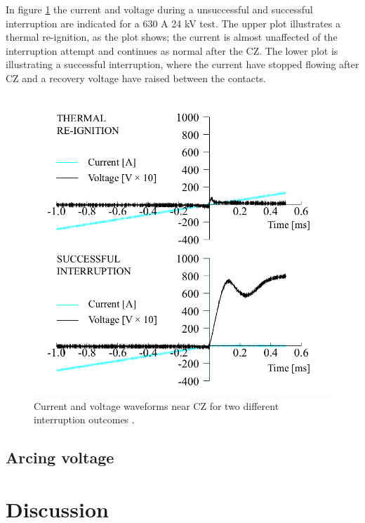 \documentclass[10pt,a4paper]{article} %
\begin{document}
In figure \ref{fig:CurrentAndVoltageWaveform} the current and voltage during a unsuccessful and successful interruption are indicated for a 630 A 24 kV test. The upper plot illustrates a thermal re-ignition, as the plot shows; the current is almost unaffected of the interruption attempt and continues as normal after the CZ. The lower plot is illustrating a successful interruption, where the current have stopped flowing after CZ and a recovery voltage have raised between the contacts.

\begin{figure}[H]
\centering
\includegraphics[scale=0.3]{Bilder/Results/differentInterruptions.png}
\caption{Current and voltage waveforms near CZ for two different interruption outcomes \cite{bib:AFIMVLBA}.} \label{fig:CurrentAndVoltageWaveform}
\end{figure}

   

\subsection{Arcing voltage}

\newpage

\section{Discussion}
\end{document}
